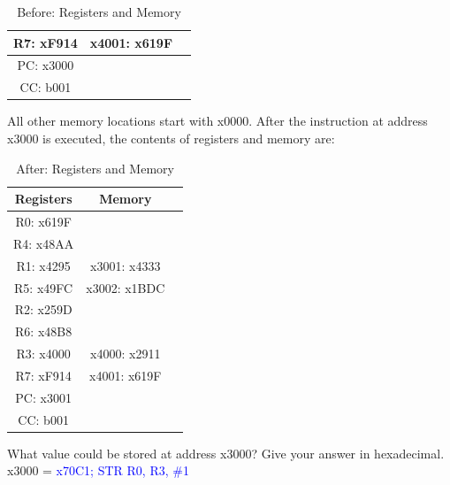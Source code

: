 \documentclass{article}
\begin{document}
\begin{enumerate}[label=(\alph*)]
\begin{enumerate}[label=(\alph*)]
\begin{enumerate}[label=(\roman*)]
\begin{table}[h]
\begin{tabular}{|c|c|c|}
            \hline
            R7: xF914 & x4001: x619F & \\
            \hline
            PC: x3000 & & \\
            \hline
            CC: b001 & & \\
            \hline
            \end{tabular}
            \caption{Before: Registers and Memory}
            \label{tab:before}
            \end{table}
            \newline
            All other memory locations start with x0000. After the instruction at address x3000 is executed, the contents of registers and memory are:
            \begin{table}[h]
            \centering
            \begin{tabular}{|c|c|c|}
            \hline
            \textbf{Registers} & \textbf{Memory} & \\
            \hline
            R0: x619F & & \\
            \hline
            R4: x48AA & & \\
            \hline
            R1: x4295 & x3001: x4333 & \\
            \hline
            R5: x49FC & x3002: x1BDC & \\
            \hline
            R2: x259D & & \\
            \hline
            R6: x48B8 & & \\
            \hline
            R3: x4000 & x4000: x2911 & \\
            \hline
            R7: xF914 & x4001: x619F & \\
            \hline
            PC: x3001 & & \\
            \hline
            CC: b001 & & \\
            \hline
            \end{tabular}
            \caption{After: Registers and Memory}
            \label{tab:after}
            \end{table}
            \newline
            What value could be stored at address x3000? Give your answer in hexadecimal.
            \newline
            \newline
            x3000 = \textcolor{blue}{x70C1; STR R0, R3, \#1}
        \end{enumerate}
        \newpage
    \end{enumerate}

\end{enumerate}
\end{document}
